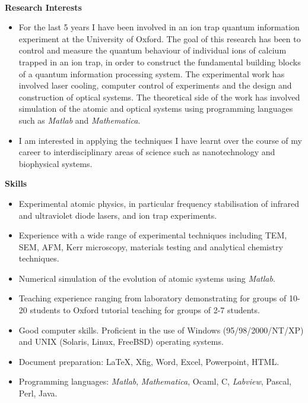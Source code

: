 \documentclass[10pt,a4paper]{article}
\begin{document}
\\
{\large \textbf{Research Interests}}
\begin{itemize}
\item For the last 5 years I have been involved in an ion trap quantum
  information experiment at the University of Oxford.  The goal of
  this research has been to control and measure the quantum behaviour
  of individual ions of calcium trapped in an ion trap, in order to
  construct the fundamental building blocks of a quantum information
  processing system.  The experimental work has involved laser
  cooling, computer control of experiments and the design and
  construction of optical systems.  The theoretical side of the work
  has involved simulation of the atomic and optical systems using
  programming languages such as \textit{Matlab} and \textit{Mathematica}. 
\item I am interested in applying the techniques I have learnt over
  the course of my career to interdisciplinary areas of science 
  such as nanotechnology and biophysical systems.
\end{itemize}

{\large \textbf{Skills}}
\begin{itemize}
  \item Experimental atomic physics, in particular frequency
    stabilisation of infrared and ultraviolet diode lasers, and  
    ion trap experiments. 
  \item Experience with a wide range of experimental techniques including
    TEM, SEM, AFM, Kerr microscopy, materials testing and analytical chemistry
    techniques.
  \item Numerical simulation of the evolution of atomic systems using
    \textit{Matlab}.
   \item Teaching experience ranging from laboratory demonstrating for groups
    of 10-20 students to Oxford tutorial teaching for groups of 
    2-7 students. 
  \item Good computer skills. Proficient in the use of Windows
    (95/98/2000/NT/XP) and UNIX (Solaris, Linux, FreeBSD) operating
    systems.
  \item Document preparation: \LaTeX, Xfig, Word, Excel, Powerpoint,
    HTML.
  \item Programming languages:  \textit{Matlab}, \textit{Mathematica},
    Ocaml, C, \textit{Labview}, Pascal, Perl, Java.
\end{itemize}

\end{document}
